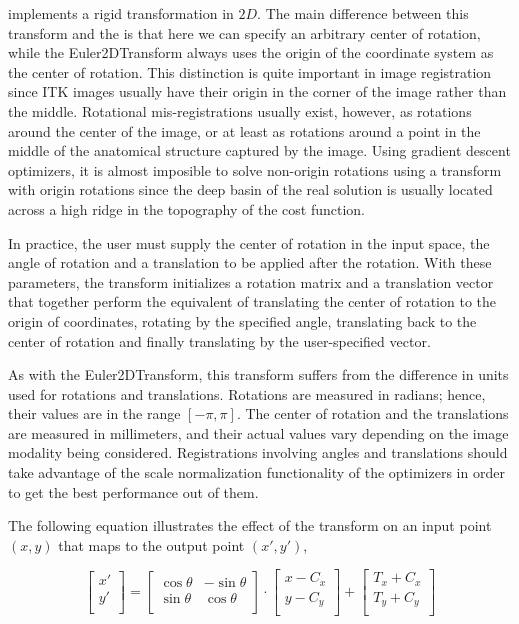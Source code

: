  implements a rigid transformation in $2D$.
The main difference between this transform and the 
is that here we can specify an arbitrary center of rotation, while the
Euler2DTransform always uses the origin of the coordinate system as the center
of rotation. This distinction is quite important in image registration since
ITK images usually have their origin in the corner of the image rather than the
middle.  Rotational mis-registrations usually exist, however, as rotations
around the center of the image, or at least as rotations around a point in the
middle of the anatomical structure captured by the image. Using gradient
descent optimizers, it is almost imposible to solve non-origin rotations using
a transform with origin rotations since the deep basin of the real solution is
usually located across a high ridge in the topography of the cost function.

In practice, the user must supply the center of rotation in the input space,
the angle of rotation and a translation to be applied after the rotation. With
these parameters, the transform initializes a rotation matrix and a translation
vector that together perform the equivalent of translating the center of
rotation to the origin of coordinates, rotating by the specified angle,
translating back to the center of rotation and finally translating by the
user-specified vector.

As with the Euler2DTransform, this transform suffers from the difference in
units used for rotations and translations. Rotations are measured in radians;
hence, their values are in the range $[-\pi,\pi]$. The center of rotation and
the translations are measured in millimeters, and their actual values vary
depending on the image modality being considered.  Registrations involving
angles and translations should take advantage of the scale normalization
functionality of the optimizers in order to get the best performance out of
them.

The following equation illustrates the effect of the transform on an input
point $(x,y)$ that maps to the output point $(x',y')$,

\begin{equation}
\left[ 
\begin{array}{c}
x' \\
y' \\
\end{array}
\right]
=
\left[ 
\begin{array}{cc}
\cos{\theta} & -\sin{\theta} \\
\sin{\theta} &  \cos{\theta} \\
\end{array}
\right]
\cdot
\left[ 
\begin{array}{c}
x - C_x \\
y - C_y \\
\end{array}
\right]
+ 
\left[ 
\begin{array}{c}
T_x + C_x \\
T_y + C_y \\
\end{array}
\right]
\end{equation}

